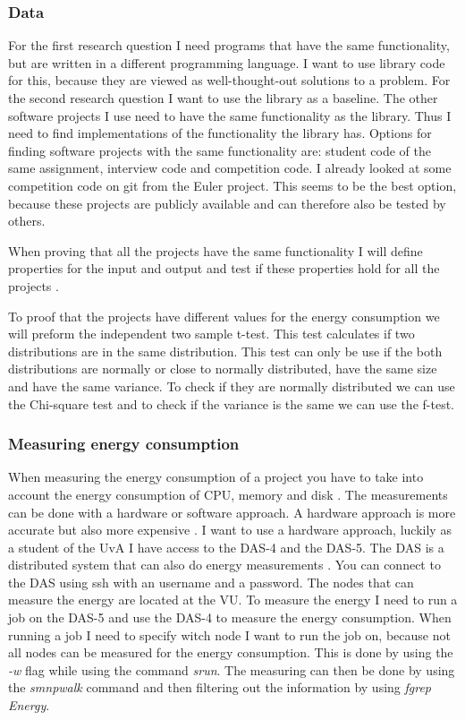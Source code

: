 \subsubsection{Data}
For the first research question I need programs that have the same functionality, but are written in a different programming language. I want to use library code for this, because they are viewed as well-thought-out solutions to a problem. For the second research question I want to use the library as a baseline. The other software projects I use need to have the same functionality as the library. Thus I need to find implementations of the functionality the library has. Options for finding software projects with the same functionality are: student code of the same assignment, interview code and competition code. I already looked at some competition code on git from the Euler project. This seems to be the best option, because these projects are publicly available and can therefore also be tested by others.

When proving that all the projects have the same functionality I will define properties for the input and output and test if these properties hold for all the projects \cite{mens2004survey}.

To proof that the projects have different values for the energy consumption we will preform the independent two sample t-test. This test calculates if two distributions are in the same distribution. This test can only be use if the both distributions are normally or close to normally distributed, have the same size and have the same variance. To check if they are normally distributed we can use the Chi-square test and to check if the variance is the same we can use the f-test.

\subsubsection{Measuring energy consumption}
When measuring the energy consumption of a project you have to take into account the energy consumption of CPU, memory and disk \cite{acar2016impact}. The measurements can be done with a hardware or software approach. A hardware approach is more accurate but also more expensive \cite{acar2016impact}. I want to use a hardware approach, luckily as a student of the UvA I have access to the DAS-4 and the DAS-5. The DAS is a distributed system that can also do energy measurements \cite{bal2016medium}. You can connect to the DAS using ssh with an username and a password. The nodes that can measure the energy are located at the VU. To measure the energy I need to run a job on the DAS-5 and use the DAS-4 to measure the energy consumption. When running a job I need to specify witch node I want to run the job on, because not all nodes can be measured for the energy consumption. This is done by using the \textit{-w} flag while using the command \textit{srun}. The measuring can then be done by using the \textit{smnpwalk} command and then filtering out the information by using \textit{fgrep Energy}.


